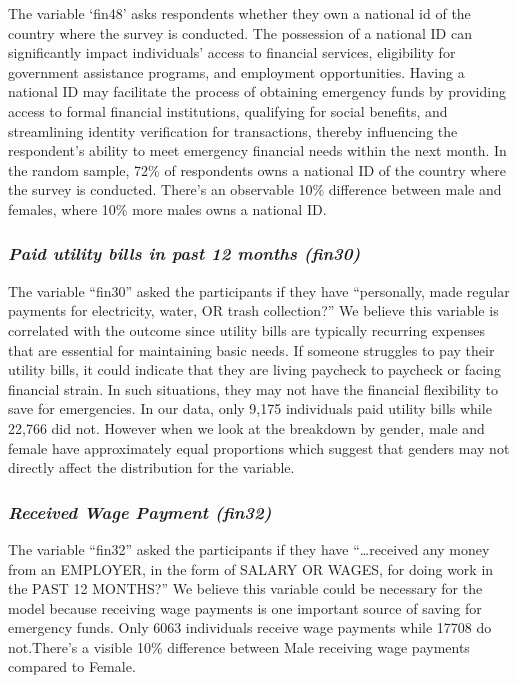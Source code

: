 \documentclass[12pt]{article}
\begin{document}
The variable `fin48' asks respondents whether they own a national id of
the country where the survey is conducted. The possession of a national
ID can significantly impact individuals' access to financial services,
eligibility for government assistance programs, and employment
opportunities. Having a national ID may facilitate the process of
obtaining emergency funds by providing access to formal financial
institutions, qualifying for social benefits, and streamlining identity
verification for transactions, thereby influencing the respondent's
ability to meet emergency financial needs within the next month. In the
random sample, 72\% of respondents owns a national ID of the country
where the survey is conducted. There's an observable 10\% difference
between male and females, where 10\% more males owns a national ID.

\hypertarget{paid-utility-bills-in-past-12-months-fin30}{%
\subsubsection{\texorpdfstring{\emph{Paid utility bills in past 12
months
(fin30)}}{Paid utility bills in past 12 months (fin30)}}\label{paid-utility-bills-in-past-12-months-fin30}}

The variable ``fin30'' asked the participants if they have ``personally,
made regular payments for electricity, water, OR trash collection?'' We
believe this variable is correlated with the outcome since utility bills
are typically recurring expenses that are essential for maintaining
basic needs. If someone struggles to pay their utility bills, it could
indicate that they are living paycheck to paycheck or facing financial
strain. In such situations, they may not have the financial flexibility
to save for emergencies. In our data, only 9,175 individuals paid
utility bills while 22,766 did not. However when we look at the
breakdown by gender, male and female have approximately equal
proportions which suggest that genders may not directly affect the
distribution for the variable.

\hypertarget{received-wage-payment-fin32}{%
\subsubsection{\texorpdfstring{\emph{Received Wage Payment
(fin32)}}{Received Wage Payment (fin32)}}\label{received-wage-payment-fin32}}

The variable ``fin32'' asked the participants if they have
``\ldots received any money from an EMPLOYER, in the form of SALARY OR
WAGES, for doing work in the PAST 12 MONTHS?'' We believe this variable
could be necessary for the model because receiving wage payments is one
important source of saving for emergency funds. Only 6063 individuals
receive wage payments while 17708 do not.There's a visible 10\%
difference between Male receiving wage payments compared to Female.
\end{document}
